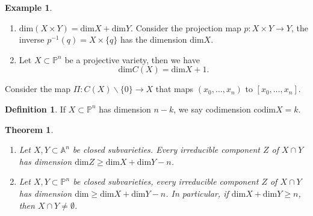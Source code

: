 \documentclass{amsart}
\theoremstyle{plain}
\newtheorem{theorem}{Theorem}
\theoremstyle{definition}
\newtheorem{definition}{Definition}
\newtheorem{example}{Example}
\theoremstyle{remark}
\numberwithin{equation}{section}
\begin{document}
\begin{example}
	\begin{enumerate}
		\item $ \text{dim}(X\times Y)=\text{dim}X+\text{dim}Y $. Consider the projection map $ p:X\times Y\to Y $, the inverse $ p^{-1}(q)=X\times \lbrace q \rbrace $ has the dimension $ \text{dim}X $.
		\item Let $ X\subset \mathbb{P}^n $ be a projective variety, then we have 
		$$
		\text{dim}C(X)=\text{dim}X+1.
		$$
	\end{enumerate}
	Consider the map $ \Pi:C(X)\backslash \lbrace 0 \rbrace\to X $ that maps $ (x_0,\dots,x_n) $ to $ [x_0,\dots,x_n] $.
\end{example}
\begin{definition}
	If $ X\subset \mathbb{P}^n $ has dimension $ n-k $, we say codimension $ \text{codim}X=k $.
\end{definition}

\begin{theorem}\label{16-1}
	\begin{enumerate}
		\item Let $ X,Y\subset \mathbb{A}^n $ be closed subvarieties. Every irreducible component $ Z $ of $ X\cap Y $ has dimension $ \text{dim}Z\geq \text{dim}X+\text{dim}Y-n $.
		\item Let $ X,Y\subset \mathbb{P}^n $ be closed subvarieties, every irreducible component $ Z $ of $ X\cap Y $ has dimension $ \text{dim}\geq \text{dim}X+\text{dim}Y-n $. In particular, if $ \text{dim}X+\text{dim}Y\geq n $, then $ X\cap Y\neq \emptyset $. 
	\end{enumerate}
\end{theorem}
\end{document}
